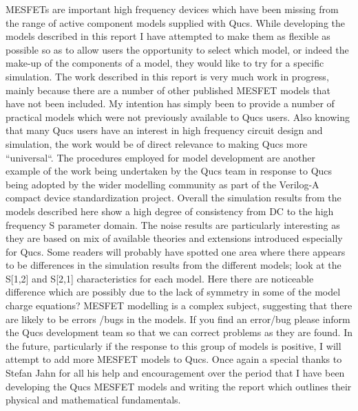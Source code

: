 
MESFETs are important high frequency devices which have been missing
from the range of active component models supplied with Qucs.  While
developing the models described in this report I have attempted to
make them as flexible as possible so as to allow users the opportunity
to select which model, or indeed the make-up of the components of a
model, they would like to try for a specific simulation.  The work
described in this report is very much work in progress, mainly because
there are a number of other published MESFET models that have not been
included.  My intention has simply been to provide a number of
practical models which were not previously available to Qucs users.
Also knowing that many Qucs users have an interest in high frequency
circuit design and simulation, the work would be of direct relevance
to making Qucs more ``universal``. The procedures employed for model
development are another example of the work being undertaken by the
Qucs team in response to Qucs being adopted by the wider modelling
community as part of the Verilog-A compact device standardization
project. Overall the simulation results from the models described here
show a high degree of consistency from DC to the high frequency S
parameter domain. The noise results are particularly interesting as
they are based on mix of available theories and extensions introduced
especially for Qucs.  Some readers will probably have spotted one area
where there appears to be differences in the simulation results from
the different models; look at the S[1,2] and S[2,1] characteristics for
each model.  Here there are noticeable difference which are possibly
due to the lack of symmetry in some of the model charge equations?
MESFET modelling is a complex subject, suggesting that there are
likely to be errors /bugs in the models.  If you find an error/bug
please inform the Qucs development team so that we can correct
problems as they are found. In the future, particularly if the
response to this group of models is positive, I will attempt to add
more MESFET models to Qucs. Once again a special thanks to Stefan Jahn
for all his help and encouragement over the period that I have been
developing the Qucs MESFET models and writing the report which
outlines their physical and mathematical fundamentals.
